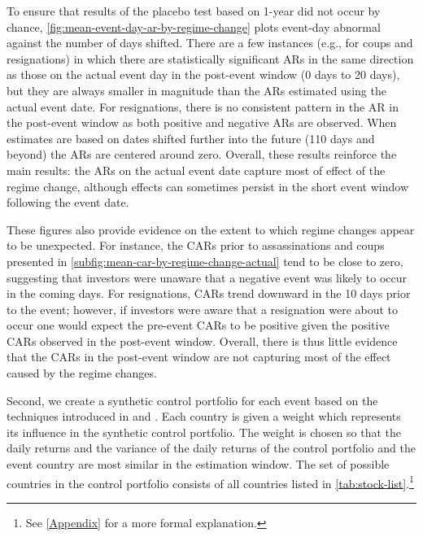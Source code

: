 \documentclass[12pt,final,fleqn]{article}
\theoremstyle{plain}
\begin{document}
To ensure that results of the placebo test based on 1-year did not occur by chance, \autoref{fig:mean-event-day-ar-by-regime-change} plots event-day abnormal against the number of days shifted. There are a few instances (e.g., for coups and resignations) in which there are statistically significant ARs in the same direction as those on the actual event day in the post-event window (0 days to 20 days), but they are always smaller in magnitude than the ARs estimated using the actual event date. For resignations, there is no consistent pattern in the AR in the post-event window as both positive and negative ARs are observed. When estimates are based on dates shifted further into the future (110 days and beyond) the ARs are centered around zero. Overall, these results reinforce the main results: the ARs on the actual event date capture most of effect of the regime change, although effects can sometimes persist in the short event window following the event date. 

These figures also provide evidence on the extent to which regime changes appear to be unexpected. For instance, the CARs prior to assassinations and coups presented in \autoref{subfig:mean-car-by-regime-change-actual} tend to be close to zero, suggesting that investors were unaware that a negative event was likely to occur in the coming days. For resignations, CARs trend downward in the 10 days prior to the event; however, if investors were aware that a resignation were about to occur one would expect the pre-event CARs to be positive given the positive CARs observed in the post-event window. Overall, there is thus little evidence that the CARs in the post-event window are not capturing most of the effect caused by the regime changes.

Second, we create a synthetic control portfolio for each event based on the techniques introduced in \citet{abadie2003economic} and \citet{abadie2010synthetic}. Each country is given a weight which represents its influence in the synthetic control portfolio. The weight is chosen so that the daily returns and the variance of the daily returns of the control portfolio and the event country are most similar in the estimation window. The set of possible countries in the control portfolio consists of all countries listed in \autoref{tab:stock-list}.\footnote{See \autoref{Appendix} for a more formal explanation.}
\end{document}
